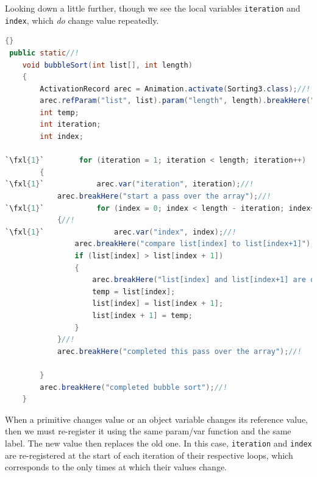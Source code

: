 \documentclass[11pt,titlepage]{book}
\def\fxl#1{%
\newdimen\fxlheight\setlength{\fxlheight}{#1\baselineskip}%
\advance\fxlheight by -0.5\baselineskip%
\begin{picture}(0,0)%
\setlength{\unitlength}{\baselineskip}%
\put(0,0){\makebox(0,0.75)[tl]{%
\colorbox{paleyellow}{%
\rule{0pt}{\fxlheight}%
\rule{\linewidth}{0pt}}%
}}\end{picture}%
}
\begin{document}
Looking down a little further, though we see the local variables \texttt{iteration} and \texttt{index}, which \textit{do} change value repeatedly.
\begin{lstlisting}[language=Java,frame=tb]{}
 public static//!
    void bubbleSort(int list[], int length)
    {
        ActivationRecord arec = Animation.activate(Sorting3.class);//!
        arec.refParam("list", list).param("length", length).breakHere("starting bubble sort");//!
        int temp;
        int iteration;
        int index;

`\fxl{1}`        for (iteration = 1; iteration < length; iteration++)
        {
`\fxl{1}`            arec.var("iteration", iteration);//!
            arec.breakHere("start a pass over the array");//!
`\fxl{1}`            for (index = 0; index < length - iteration; index++)
            {//!
`\fxl{1}`                arec.var("index", index);//!
                arec.breakHere("compare list[index] to list[index+1]");//!
                if (list[index] > list[index + 1]) 
                {
                    arec.breakHere("list[index] and list[index+1] are out of order - swap them");//!
                    temp = list[index];
                    list[index] = list[index + 1];
                    list[index + 1] = temp;
                }
            }//!
            arec.breakHere("completed this pass over the array");//!

        }
        arec.breakHere("completed bubble sort");//!
    }
\end{lstlisting}
When a primitive changes value or an object variable changes its
reference value, then we must re-register it using the same param/var
function and the same label. The new value then replaces the old
one. In this case, \texttt{iteration} and \texttt{index} are
re-registered at the start of each iteration of their respective
loops, which corresponds to the only times at which their values
change.
\end{document}

